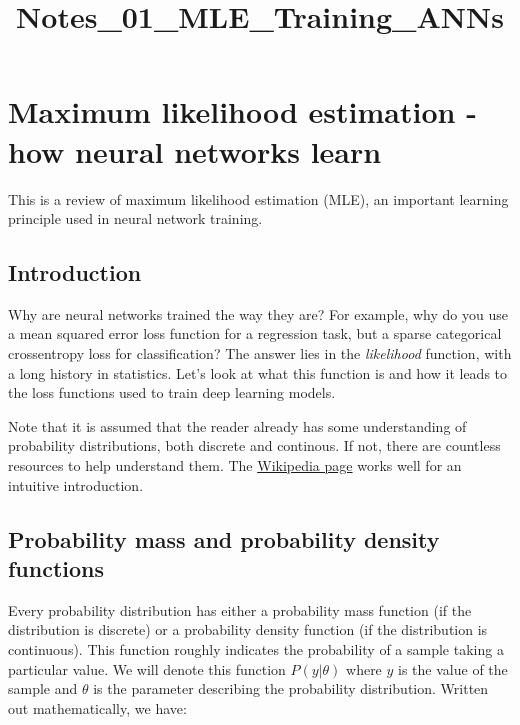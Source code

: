 \documentclass[11pt]{article}
\title{Notes\_01\_MLE\_Training\_ANNs}
\begin{document}
    
    \maketitle
    
    

    
    \hypertarget{maximum-likelihood-estimation---how-neural-networks-learn}{%
\section{Maximum likelihood estimation - how neural networks
learn}\label{maximum-likelihood-estimation---how-neural-networks-learn}}

    This is a review of maximum likelihood estimation (MLE), an important
learning principle used in neural network training.

    \hypertarget{introduction}{%
\subsection{Introduction}\label{introduction}}

Why are neural networks trained the way they are? For example, why do
you use a mean squared error loss function for a regression task, but a
sparse categorical crossentropy loss for classification? The answer lies
in the \emph{likelihood} function, with a long history in statistics.
Let's look at what this function is and how it leads to the loss
functions used to train deep learning models.

Note that it is assumed that the reader already has some understanding
of probability distributions, both discrete and continous. If not, there
are countless resources to help understand them. The
\href{https://en.wikipedia.org/wiki/Probability_distribution}{Wikipedia
page} works well for an intuitive introduction.

    \hypertarget{probability-mass-and-probability-density-functions}{%
\subsection{Probability mass and probability density
functions}\label{probability-mass-and-probability-density-functions}}

Every probability distribution has either a probability mass function
(if the distribution is discrete) or a probability density function (if
the distribution is continuous). This function roughly indicates the
probability of a sample taking a particular value. We will denote this
function \(P(y | \theta)\) where \(y\) is the value of the sample and
\(\theta\) is the parameter describing the probability distribution.
Written out mathematically, we have:
\end{document}
